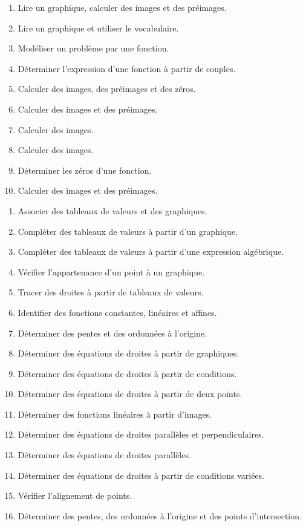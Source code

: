 \documentclass[a4paper,12pt]{report}
\begin{document}
{\footnotesize
{}
\begin{enumerate}[label=\arabic*)]
    \item Lire un graphique, calculer des images et des préimages.
    \item Lire un graphique et utiliser le vocabulaire.
    \item Modéliser un problème par une fonction.
    \item Déterminer l'expression d'une fonction à partir de couples.
    \item Calculer des images, des préimages et des zéros.
    \item Calculer des images et des préimages.
    \item Calculer des images.
    \item Calculer des images.
	\item Déterminer les zéros d'une fonction.
	\item Calculer des images et des préimages.
\end{enumerate}

\begin{enumerate}[label=\arabic*),resume]
    \item Associer des tableaux de valeurs et des graphiques.
    \item Compléter des tableaux de valeurs à partir d'un graphique.
    \item Compléter des tableaux de valeurs à partir d'une expression algébrique.
    \item Vérifier l'appartenance d'un point à un graphique.
    \item Tracer des droites à partir de tableaux de valeurs.
    \item Identifier des fonctions constantes, linéaires et affines.
    \item Déterminer des pentes et des ordonnées à l'origine.
    \item Déterminer des équations de droites à partir de graphiques.
    \item Déterminer des équations de droites à partir de conditions.
    \item Déterminer des équations de droites à partir de deux points.
    \item Déterminer des fonctions linéaires à partir d'images.
    \item Déterminer des équations de droites parallèles et perpendiculaires.
    \item Déterminer des équations de droites parallèles.
    \item Déterminer des équations de droites à partir de conditions variées.
    \item Vérifier l'alignement de points.
    \item Déterminer des pentes, des ordonnées à l'origine et des points d'intersection.
\end{enumerate}

}
\end{document}
